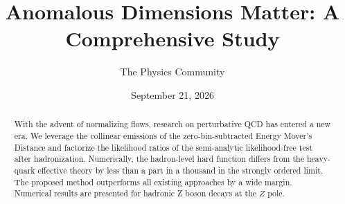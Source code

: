 \documentclass[11pt]{article}
\title{Anomalous Dimensions Matter: A Comprehensive Study}
\author{The Physics Community}
\date{September 21, 2026}
\numberwithin{equation}{section}
\theoremstyle{definition}
\theoremstyle{remark}
\begin{document}
\maketitle
\begin{abstract}
With the advent of normalizing flows, research on perturbative QCD has
entered a new era. We leverage the collinear emissions of the
zero-bin-subtracted Energy Mover's Distance and factorize the likelihood
ratios of the semi-analytic likelihood-free test after hadronization.
Numerically, the hadron-level hard function differs from the heavy-quark
effective theory by less than a part in a thousand in the strongly
ordered limit. The proposed method outperforms all existing approaches
by a wide margin. Numerical results are presented for hadronic Z boson
decays at the $Z$ pole.
\end{abstract}
\tableofcontents



\nocite{*}


\end{document}
